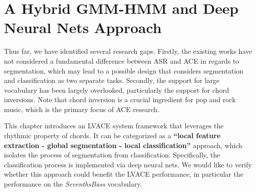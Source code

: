 
\chapter{A Hybrid GMM-HMM and Deep Neural Nets Approach}\label{cp:ghmm}



Thus far, we have identified several research gaps. Firstly, the existing works have not considered a fundamental difference between ASR and ACE in regards to segmentation, which may lead to a possible design that considers segmentation and classification as two separate tasks. Secondly, the support for large vocabulary has been largely overlooked, particularly the support for chord inversions. Note that chord inversion is a crucial ingredient for pop and rock music, which is the primary focus of ACE research.

This chapter introduces an LVACE system framework that leverages the rhythmic property of chords. It can be categorized as a \textbf{``local feature extraction - global segmentation - local classification''} approach, which isolates the process of segmentation from classification. Specifically, the classification process is implemented via deep neural nets. We would like to verify whether this approach could benefit the LVACE performance, in particular the performance on the \textit{SeventhsBass} vocabulary.

